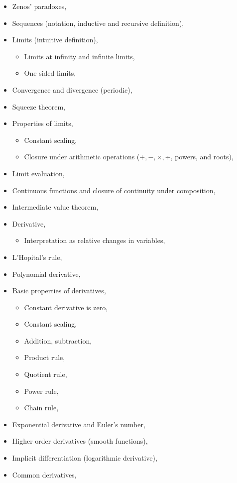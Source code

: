 \begin{itemize}
\tightlist
\item
  Zenos' paradoxes,
\item
  Sequences (notation, inductive and recursive definition),
\item
  Limits (intuitive definition),

  \begin{itemize}
  \tightlist
  \item
    Limits at infinity and infinite limits,
  \item
    One sided limits,
  \end{itemize}
\item
  Convergence and divergence (periodic),
\item
  Squeeze theorem,
\item
  Properties of limits,

  \begin{itemize}
  \tightlist
  \item
    Constant scaling,
  \item
    Closure under arithmetic operations (\(+, -, \times, \div\), powers,
    and roots),
  \end{itemize}
\item
  Limit evaluation,
\item
  Continuous functions and closure of continuity under composition,
\item
  Intermediate value theorem,
\item
  Derivative,

  \begin{itemize}
  \tightlist
  \item
    Interpretation as relative changes in variables,
  \end{itemize}
\item
  L'Hopital's rule,
\item
  Polynomial derivative,
\item
  Basic properties of derivatives,

  \begin{itemize}
  \tightlist
  \item
    Constant derivative is zero,
  \item
    Constant scaling,
  \item
    Addition, subtraction,
  \item
    Product rule,
  \item
    Quotient rule,
  \item
    Power rule,
  \item
    Chain rule,
  \end{itemize}
\item
  Exponential derivative and Euler's number,
\item
  Higher order derivatives (smooth functions),
\item
  Implicit differentiation (logarithmic derivative),
\item
  Common derivatives,


\end{itemize}
